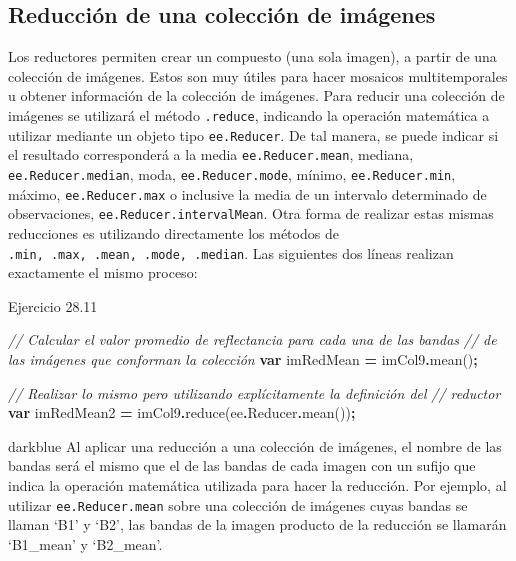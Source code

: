 \documentclass[
  12pt,
  letterpaper,
  twoside]{book}
\newenvironment{Shaded}{\begin{snugshade}}{\end{snugshade}}
\newcommand{\AttributeTok}[1]{\textcolor[rgb]{0.77,0.63,0.00}{#1}}
\newcommand{\CommentTok}[1]{\textcolor[rgb]{0.56,0.35,0.01}{\textit{#1}}}
\newcommand{\FunctionTok}[1]{\textcolor[rgb]{0.00,0.00,0.00}{#1}}
\newcommand{\KeywordTok}[1]{\textcolor[rgb]{0.13,0.29,0.53}{\textbf{#1}}}
\newcommand{\NormalTok}[1]{#1}
\newcommand{\OperatorTok}[1]{\textcolor[rgb]{0.81,0.36,0.00}{\textbf{#1}}}
\begin{document}
\hypertarget{reducciuxf3n-de-una-colecciuxf3n-de-imuxe1genes}{%
\subsection{Reducción de una colección de imágenes}\label{reducciuxf3n-de-una-colecciuxf3n-de-imuxe1genes}}

Los reductores permiten crear un compuesto (una sola imagen), a partir de una colección de imágenes. Estos son muy útiles para hacer mosaicos multitemporales u obtener información de la colección de imágenes. Para reducir una colección de imágenes se utilizará el método \texttt{.reduce}, indicando la operación matemática a utilizar mediante un objeto tipo \texttt{ee.Reducer}. De tal manera, se puede indicar si el resultado corresponderá a la media \texttt{ee.Reducer.mean}, mediana, \texttt{ee.Reducer.median}, moda, \texttt{ee.Reducer.mode}, mínimo, \texttt{ee.Reducer.min}, máximo, \texttt{ee.Reducer.max} o inclusive la media de un intervalo determinado de observaciones, \texttt{ee.Reducer.intervalMean}. Otra forma de realizar estas mismas reducciones es utilizando directamente los métodos de \texttt{.min,\ .max,\ .mean,\ .mode,\ .median}. Las siguientes dos líneas realizan exactamente el mismo proceso:

Ejercicio 28.11

\begin{Shaded}
\begin{Highlighting}[]
\CommentTok{// Calcular el valor promedio de reflectancia para cada una de las bandas }
\CommentTok{// de las imágenes que conforman la colección}
\KeywordTok{var}\NormalTok{ imRedMean }\OperatorTok{=}\NormalTok{ imCol9}\OperatorTok{.}\FunctionTok{mean}\NormalTok{()}\OperatorTok{;}

\CommentTok{// Realizar lo mismo pero utilizando explícitamente la definición del }
\CommentTok{// reductor}
\KeywordTok{var}\NormalTok{ imRedMean2 }\OperatorTok{=}\NormalTok{ imCol9}\OperatorTok{.}\FunctionTok{reduce}\NormalTok{(ee}\OperatorTok{.}\AttributeTok{Reducer}\OperatorTok{.}\FunctionTok{mean}\NormalTok{())}\OperatorTok{;}
\end{Highlighting}
\end{Shaded}

\begin{bluebox2}

\begin{awesomeblock}{5pt}{\faLightbulb}{darkblue}
Al aplicar una reducción a una colección de imágenes, el nombre de las bandas será el mismo que el de las bandas de cada imagen con un sufijo que indica la operación matemática utilizada para hacer la reducción. Por ejemplo, al utilizar \texttt{ee.Reducer.mean} sobre una colección de imágenes cuyas bandas se llaman `B1' y `B2', las bandas de la imagen producto de la reducción se llamarán `B1\_mean' y `B2\_mean'.

\end{awesomeblock}

\end{bluebox2}
\end{document}
